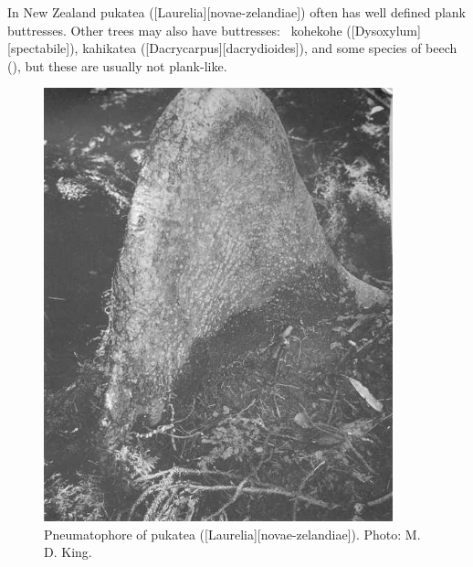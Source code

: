 In New Zealand pukatea ([Laurelia][novae-zelandiae]) often has well defined plank buttresses.
Other trees may also have buttresses: \eg\ kohekohe ([Dysoxylum][spectabile]), kahikatea ([Dacrycarpus][dacrydioides]), and some species of beech (), but these are usually not plank-like.

\begin{figure}[htb]
	\centering
	\begin{minipage}[t]{0.54\textwidth}
		\centering
		\includegraphics[width=0.9\textwidth]{graphics/figure10pukatea.jpg}
    	\caption[Pneumatophore of pukatea]{Pneumatophore of pukatea ([Laurelia][novae-zelandiae]).
    	Photo:  M. D. King.}%
    	\label{fig:10pukatea}
	\end{minipage}\hfill%
	\begin{minipage}[t]{0.44\textwidth}
    	\centering

\end{minipage}
\end{figure}
